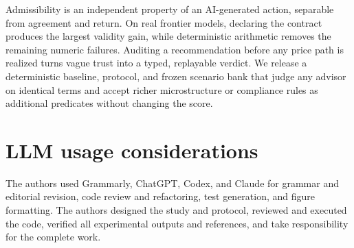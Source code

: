 \documentclass[sigconf,review,anonymous]{acmart}
\begin{document}
Admissibility is an independent property of an AI-generated action, separable from agreement and return. On real frontier models, declaring the contract produces the largest validity gain, while deterministic arithmetic removes the remaining numeric failures. Auditing a recommendation before any price path is realized turns vague trust into a typed, replayable verdict. We release a deterministic baseline, protocol, and frozen scenario bank that judge any advisor on identical terms and accept richer microstructure or compliance rules as additional predicates without changing the score.

\section*{LLM usage considerations}
The authors used Grammarly, ChatGPT, Codex, and Claude for grammar and editorial revision, code review and refactoring, test generation, and figure formatting. The authors designed the study and protocol, reviewed and executed the code, verified all experimental outputs and references, and take responsibility for the complete work.

\balance


\end{document}
